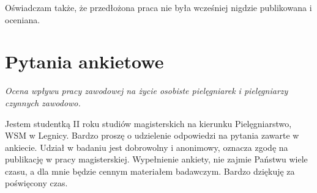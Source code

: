 \documentclass[a4paper,12pt,twoside,openright]{mwrep}
\begin{document}
\begin{appendices}
Oświadczam także, że przedłożona praca nie była wcześniej nigdzie publikowana i oceniana.

\vspace{\baselineskip} 
\vspace{\baselineskip} 



\chapter{Pytania ankietowe}
\label{app:ankieta}



\textit{\Large{Ocena wpływu pracy zawodowej na życie osobiste pielęgniarek i pielęgniarzy czynnych zawodowo.}}

\vspace{\baselineskip} 

Jestem studentką II roku studiów magisterskich na kierunku Pielęgniarstwo, WSM w Legnicy. Bardzo proszę o udzielenie odpowiedzi na pytania zawarte w ankiecie. Udział w badaniu jest dobrowolny i anonimowy, oznacza zgodę na publikację w pracy magisterskiej. Wypełnienie ankiety, nie zajmie Państwu wiele czasu, a dla mnie będzie cennym materiałem badawczym. Bardzo dziękuję za poświęcony czas.


\end{appendices}
\end{document}
